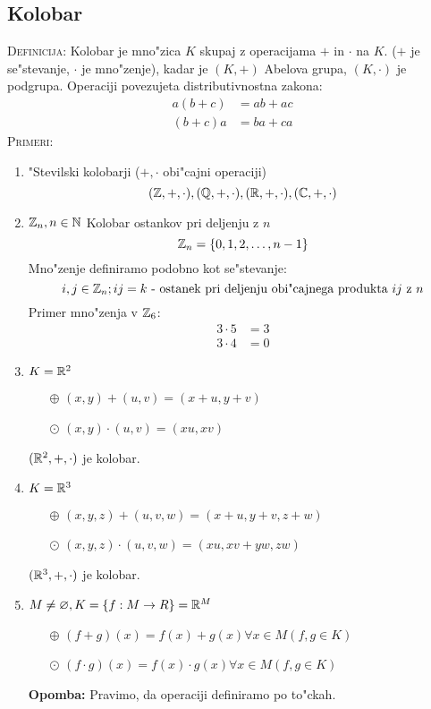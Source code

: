 \subsection{Kolobar}
\textsc{Definicija:} Kolobar je mno"zica $K$ skupaj z operacijama $+$ in $\cdot$ na $K$. ($+$ je se"stevanje, $\cdot$ je mno"zenje), kadar je $(K, +)$ Abelova grupa, $(K, \cdot)$ je podgrupa. Operaciji povezujeta distributivnostna zakona:
\begin{align*}
a(b+c) &= ab + ac \\
(b+c)a &= ba + ca
\end{align*}
\textsc{Primeri:}
\begin{enumerate}[(1)]
	\item "Stevilski kolobarji ($+, \cdot$ obi"cajni operaciji)
	\begin{equation*}
	(\mathbb{Z}, +, \cdot), (\mathbb{Q}, +, \cdot), (\mathbb{R}, +, \cdot), (\mathbb{C}, +, \cdot)
	\end{equation*}
	
	\item $\mathbb{Z}_n, n \in \mathbb{N}$ Kolobar ostankov pri deljenju z $n$
	\begin{equation*}
	\mathbb{Z}_n = \{0, 1, 2, \ldots, n-1\}
	\end{equation*}
	Mno"zenje definiramo podobno kot se"stevanje:
	\begin{equation*}
	i, j \in \mathbb{Z}_n; ij = k \text{ - ostanek pri deljenju obi"cajnega produkta $ij$ z $n$}
	\end{equation*}
	Primer mno"zenja v $\mathbb{Z}_6$:
	\begin{align*}
	3 \cdot 5 &= 3 \\
	3 \cdot 4 &= 0
	\end{align*}
	
	\item $K = \mathbb{R}^2$
	\begin{itemize}
		\item[$\oplus$] $(x, y) + (u, v) = (x + u, y + v)$
		\item [$\odot$] $(x, y) \cdot (u, v) = (xu, xv)$
	\end{itemize}
	$(\mathbb{R}^2, +, \cdot)$ je kolobar.
	
	\item $K = \mathbb{R}^3$
	\begin{itemize}
		\item[$\oplus$] $(x, y, z) + (u, v, w) = (x + u, y + v, z + w)$
		\item [$\odot$] $(x, y, z) \cdot (u, v, w) = (xu, xv + yw, zw)$
	\end{itemize}
	$(\mathbb{R}^3, +, \cdot)$ je kolobar.
	
	\item $M \neq \varnothing, K = \{f: M \to R\} = \mathbb{R}^M$
	\begin{itemize}
		\item[$\oplus$] $(f+g)(x) = f(x) + g(x) \forall x \in M (f, g \in K)$
		\item [$\odot$] $(f\cdot g)(x) = f(x) \cdot g(x) \forall x \in M (f, g \in K)$
	\end{itemize}
	\textbf{Opomba:} Pravimo, da operaciji definiramo po to"ckah.
\end{enumerate}
